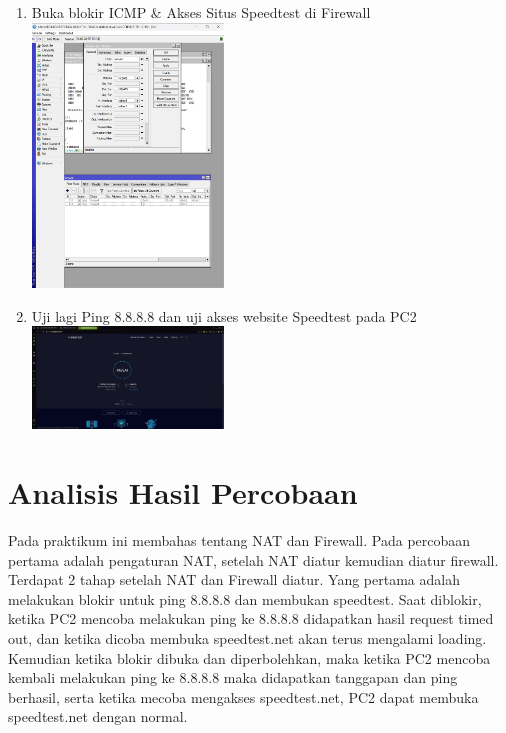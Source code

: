 \begin{enumerate}
	\item Buka blokir ICMP \& Akses Situs Speedtest di Firewall\\
	\includegraphics[width=0.4\textwidth]{p4/img/unblock.jpg}
	\item Uji lagi Ping 8.8.8.8 dan uji akses website Speedtest pada PC2\\
	\includegraphics[width=0.4\textwidth]{p4/img/spdtst.jpg}
\end{enumerate}
\section{Analisis Hasil Percobaan}
Pada praktikum ini membahas tentang NAT dan Firewall. Pada percobaan pertama adalah pengaturan NAT, setelah NAT diatur kemudian diatur firewall. Terdapat 2 tahap setelah NAT dan Firewall diatur. Yang pertama adalah melakukan blokir untuk ping 8.8.8.8 dan membukan speedtest. Saat diblokir, ketika PC2 mencoba melakukan ping ke 8.8.8.8 didapatkan hasil request timed out, dan ketika dicoba membuka speedtest.net akan terus mengalami loading. Kemudian ketika blokir dibuka dan diperbolehkan, maka ketika PC2 mencoba kembali melakukan ping ke 8.8.8.8 maka didapatkan tanggapan dan ping berhasil, serta ketika mecoba mengakses speedtest.net, PC2 dapat membuka speedtest.net dengan normal.
